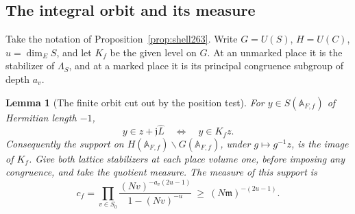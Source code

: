 \documentclass[a4paper,11pt]{article}
\newtheorem{lemma}[proposition]{Lemma}
\theoremstyle{definition}
\theoremstyle{remark}
\numberwithin{equation}{section}
\begin{document}
\subsection{The integral orbit and its measure}\label{nav:VII-42}
Take the notation of Proposition~\ref{prop:shell263}. Write
\(G=U(S)\), \(H=U(C)\), \(u=\dim_E S\), and let \(K_f\)
be the given level on \(G\). At an unmarked place it is the
stabilizer of \(\Lambda_S\), and at a marked place it is its
principal congruence subgroup of depth \(a_v\).

\begin{lemma}[The finite orbit cut out by the position test]\leavevmode
\label{lem:orbvol263}
For \(y\in S(\mathbb A_{F,f})\) of Hermitian length \(-1\),
\[
      y\in z+\mathfrak j\widehat L
             \quad\Longleftrightarrow\quad y\in K_f z .
\]
Consequently the support on \(H(\mathbb A_{F,f})\backslash
G(\mathbb A_{F,f})\), under \(g\mapsto g^{-1}z\), is the
image of \(K_f\). Give both lattice stabilizers at each place
volume one, before imposing any congruence, and take the quotient
measure. The measure of this support is
\[
       c_f=\prod_{v\in S_0}
             \frac{(Nv)^{-a_v(2u-1)}}{1-(Nv)^{-u}}
             \ \ge\ (N\mathfrak m)^{-(2u-1)} .
\]
\end{lemma}
\end{document}
